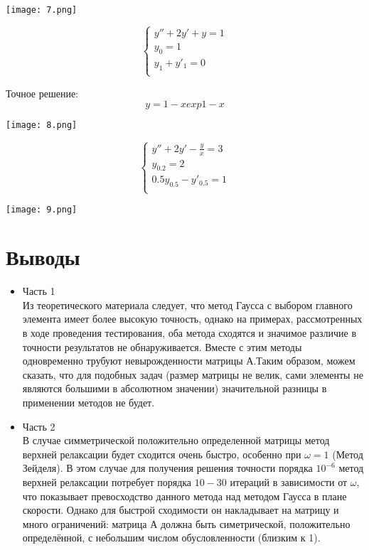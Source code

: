\documentclass[a4paper,12pt,titlepage,finall]{article}
\begin{document}
\begin{itemize}
\texttt{[image: 7.png]}\newline
\newpage

\begin{equation*}
 \begin{cases}
  y''+2y'+y=1\\
  y_{0}=1\\
  y_{1}+y'_{1}=0\\
 \end{cases}
\end{equation*}

Точное решение: $$y =1-xexp{1-x}$$ \newline

\texttt{[image: 8.png]}\newline

\begin{equation*}
 \begin{cases}
  y''+2y'-\frac{y}{x}=3\\
  y_{0.2}=2\\
  0.5y_{0.5}-y'_{0.5}=1\\
 \end{cases}
\end{equation*}

\texttt{[image: 9.png]}\newline


\end{itemize}

\newpage
\section{Выводы}

\begin{itemize}
\item Часть 1\\

 Из теоретического материала следует, что  метод Гаусса с выбором главного элемента имеет более высокую точность, однако на примерах, рассмотренных в ходе проведения тестирования, оба метода сходятся и значимое различие в точности результатов не обнаруживается. Вместе с этим методы одновременно трубуют невырожденности матрицы А.Таким образом, можем сказать, что для подобных задач (размер матрицы не велик, сами элементы не являются большими в абсолютном значении) значительной разницы в применении методов не будет.

\item Часть 2\\

В случае симметрической положительно определенной матрицы метод верхней релаксации будет сходится очень быстро, особенно при $\omega = 1$ (Метод Зейделя). В этом случае для получения решения точности порядка $10^{-6}$ метод верхней релаксации потребует порядка $10-30$ итераций в зависимости от $\omega$, что показывает превосходство данного метода над методом Гаусса в плане скорости. Однако для быстрой сходимости он накладывает на матрицу и много ограничений: матрица А должна быть симетрической, положительно определённой, с небольшим числом обусловленности (близким к 1).


\end{itemize}

\newpage
\end{document}
